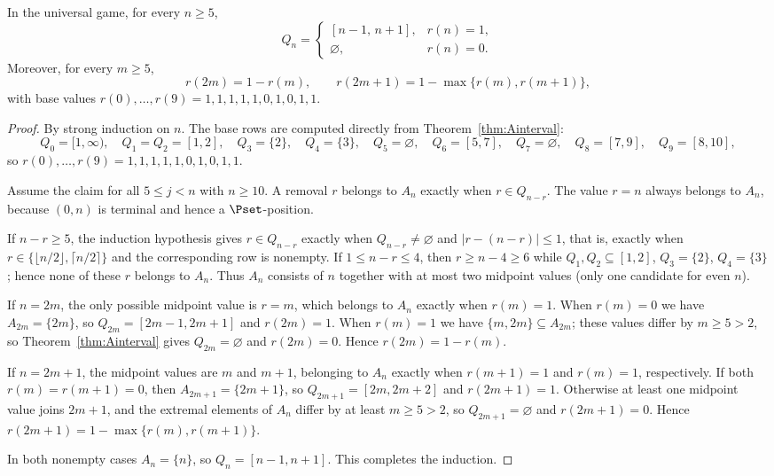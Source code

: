 \begin{theorem}\label{thm:Cuniversal}
In the universal game, for every $n\ge5$,
\[
Q_n=\begin{cases}[n-1,\,n+1],&r(n)=1,\\ \varnothing,&r(n)=0.\end{cases}
\]
Moreover, for every $m\ge5$,
\begin{equation}\label{eq:recursion}
r(2m)=1-r(m),\qquad
r(2m+1)=1-\max\{r(m),r(m+1)\},
\end{equation}
with base values $r(0),\ldots,r(9)=1,1,1,1,1,0,1,0,1,1$.
\end{theorem}
\begin{proof}
By strong induction on $n$. The base rows are computed directly from Theorem~\ref{thm:Ainterval}:
\[
Q_0=[1,\infty),\quad Q_1=Q_2=[1,2],\quad Q_3=\{2\},\quad Q_4=\{3\},
\quad Q_5=\varnothing,\quad Q_6=[5,7],\quad Q_7=\varnothing,\quad Q_8=[7,9],\quad Q_9=[8,10],
\]
so $r(0),\ldots,r(9)=1,1,1,1,1,0,1,0,1,1$.

Assume the claim for all $5\le j<n$ with $n\ge10$. A removal $r$ belongs to $A_n$ exactly when $r\in Q_{n-r}$. The value $r=n$ always belongs to $A_n$, because $(0,n)$ is terminal and hence a $\Pset$-position.

If $n-r\ge5$, the induction hypothesis gives $r\in Q_{n-r}$ exactly when $Q_{n-r}\ne\varnothing$ and $|r-(n-r)|\le1$, that is, exactly when $r\in\{\lfloor n/2\rfloor,\lceil n/2\rceil\}$ and the corresponding row is nonempty. If $1\le n-r\le4$, then $r\ge n-4\ge6$ while $Q_1,Q_2\subseteq[1,2]$, $Q_3=\{2\}$, $Q_4=\{3\}$; hence none of these $r$ belongs to $A_n$. Thus $A_n$ consists of $n$ together with at most two midpoint values (only one candidate for even $n$).

If $n=2m$, the only possible midpoint value is $r=m$, which belongs to $A_n$ exactly when $r(m)=1$. When $r(m)=0$ we have $A_{2m}=\{2m\}$, so $Q_{2m}=[2m-1,2m+1]$ and $r(2m)=1$. When $r(m)=1$ we have $\{m,2m\}\subseteq A_{2m}$; these values differ by $m\ge5>2$, so Theorem~\ref{thm:Ainterval} gives $Q_{2m}=\varnothing$ and $r(2m)=0$. Hence $r(2m)=1-r(m)$.

If $n=2m+1$, the midpoint values are $m$ and $m+1$, belonging to $A_n$ exactly when $r(m+1)=1$ and $r(m)=1$, respectively. If both $r(m)=r(m+1)=0$, then $A_{2m+1}=\{2m+1\}$, so $Q_{2m+1}=[2m,2m+2]$ and $r(2m+1)=1$. Otherwise at least one midpoint value joins $2m+1$, and the extremal elements of $A_n$ differ by at least $m\ge5>2$, so $Q_{2m+1}=\varnothing$ and $r(2m+1)=0$. Hence $r(2m+1)=1-\max\{r(m),r(m+1)\}$.

In both nonempty cases $A_n=\{n\}$, so $Q_n=[n-1,n+1]$. This completes the induction.
\end{proof}

